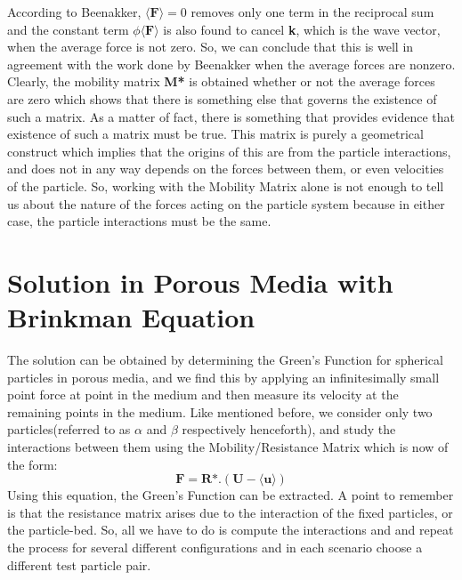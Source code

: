 \documentclass[12pt]{article}
\begin{document}
According to Beenakker, $\langle \textbf{F} \rangle = 0$ removes only one term in the reciprocal sum and the constant term $\phi\langle \textbf{F} \rangle$ is also found to cancel \textbf{k}, which is the wave vector, when the average force is not zero. So, we can conclude that this is well in agreement with the work done by Beenakker when the average forces are nonzero. Clearly, the mobility matrix \textbf{M*} is obtained whether or not the average forces are zero which shows that there is something else that governs the existence of such a matrix. As a matter of fact, there is something that provides evidence that existence of such a matrix must be true.
This matrix is purely a geometrical construct which implies that the origins of this are from the particle interactions, and does not in any way depends on the forces between them, or even velocities of the particle. So, working with the Mobility Matrix alone is not enough to tell us about the nature of the forces acting on the particle system because in either case, the particle interactions must be the same.


\section{Solution in Porous Media with Brinkman Equation}
The solution can be obtained by determining the Green's Function for spherical particles in porous media, and we find this by applying an infinitesimally small point force at  point in the medium and then measure its velocity at the remaining points in the medium. Like mentioned before, we consider only two particles(referred to as $\alpha$ and $\beta$ respectively henceforth), and study the interactions between them using the Mobility/Resistance Matrix which is now of the form:
\begin{equation}
\label{eq13}
\textbf{F}=\textbf{R*}.(\textbf{U}- \langle \textbf{u} \rangle)
\end{equation}
Using this equation, the Green's Function can be extracted. A point to remember is that the resistance matrix arises due to the interaction of the fixed particles, or the particle-bed. So, all we have to do is compute the interactions and and repeat the process for several different configurations and in each scenario choose a different test particle pair.
\end{document}

